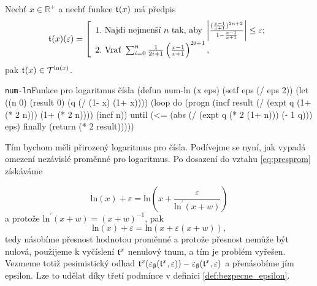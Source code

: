 \begin{fact}
Nechť $x\in\mathbb{R}^+$ a nechť funkce $\mathfrak{t}^{}(x)$ má předpis
\begin{equation}
\mathfrak{t}^{}(x)(\varepsilon)=\left[\begin{array}{l}\mathrm{1.~}\text{Najdi~nejmenší~}n\text{~tak,~aby~}\left|\frac{(\frac{x-1}{x+1})^{2n+2}}{1-\frac{x-1}{x+1}}\right| \leq \varepsilon;\\
\mathrm{2.~}\text{Vrať~}\sum_{i=0}^n \frac{1}{2i+1}\left(\frac{x-1}{x+1}\right)^{2i+1},\end{array}\right.
\end{equation}
pak $\mathfrak{t}^{}(x)\in\mathcal{T}^{\mathrm{ln}(x)}$.
\end{fact}
\begin{lispcode}{\texttt{num-ln}}{Funkce pro logaritmus čísla}
(\textcolor{funkcionalni}{defun} \textcolor{pojmenovan}{num-ln} (x eps)
  (\textcolor{vedlejsi}{setf} eps (\textcolor{matematicke}{/} eps 2))
  (\textcolor{vedlejsi}{let} ((n 0) (result 0) (q (\textcolor{matematicke}{/} (\textcolor{matematicke}{1-} x) (\textcolor{matematicke}{1+} x))))
    (\textcolor{funkcionalni}{loop} 
     \textcolor{obarvi}{do} (\textcolor{funkcionalni}{progn} 
          (\textcolor{vedlejsi}{incf} result
                (\textcolor{matematicke}{/} (\textcolor{matematicke}{expt} q (\textcolor{matematicke}{1+} (\textcolor{matematicke}{*} 2 n))) (\textcolor{matematicke}{1+} (\textcolor{matematicke}{*} 2 n))))
          (\textcolor{vedlejsi}{incf} n))
     \textcolor{obarvi}{until} (\textcolor{matematicke}{<=} (\textcolor{matematicke}{abs} (\textcolor{matematicke}{/} (\textcolor{matematicke}{expt} q (\textcolor{matematicke}{*} 2 (\textcolor{matematicke}{1+} n))) (\textcolor{matematicke}{-} 1 q)))
               eps)
     \textcolor{obarvi}{finally} (\textcolor{funkcionalni}{return} (\textcolor{matematicke}{*} 2 result)))))
\end{lispcode}

Tím bychom měli přirozený logaritmus pro čísla. Podívejme se nyní, jak vypadá omezení nezávislé proměnné pro logaritmus. Po dosazení do vztahu \eqref{eq:presprom} získáváme

\begin{equation}
\mathrm{ln}(x)+\varepsilon=\mathrm{ln}\left(x+\frac{\varepsilon}{\mathrm{ln}^{'}(x+w)}\right)
\end{equation}
a protože $\mathrm{ln}^{'}(x+w)=(x+w)^{-1}$, pak
\begin{equation}
\mathrm{ln}(x)+\varepsilon=\mathrm{ln}(x+\varepsilon(x+w)),
\end{equation}
tedy násobíme přesnost hodnotou proměnné a protože přesnost nemůže být nulová, použijeme k vyčíslení $\mathfrak{t}^{x}$ nenulový tnum, a tím je problém vyřešen. Vezmeme totiž pesimistický odhad $\mathfrak{t}^{x}(\varepsilon_\emptyset(\mathfrak{t}^{x},\varepsilon))-\varepsilon_\emptyset(\mathfrak{t}^{x},\varepsilon)$ a přenásobíme jím epsilon. Lze to udělat díky třetí podmínce v definici \ref{def:bezpecne_epsilon}.

